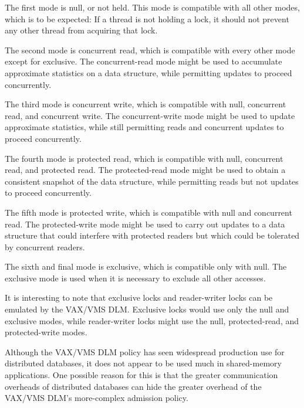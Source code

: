 The first mode is null, or not held.
This mode is compatible with all other modes, which is to be expected:
If a thread is not holding a lock, it should not prevent any
other thread from acquiring that lock.

The second mode is concurrent read, which is compatible with every other
mode except for exclusive.
The concurrent-read mode might be used to accumulate approximate
statistics on a data structure, while permitting updates to proceed
concurrently.

The third mode is concurrent write, which is compatible with null,
concurrent read, and concurrent write.
The concurrent-write mode might be used to update approximate statistics,
while still permitting reads and concurrent updates to proceed
concurrently.

The fourth mode is protected read, which is compatible with null,
concurrent read, and protected read.
The protected-read mode might be used to obtain a consistent snapshot
of the data structure, while permitting reads but not updates to
proceed concurrently.

The fifth mode is protected write, which is compatible with null and
concurrent read.
The protected-write mode might be used to carry out updates to a data
structure that could interfere with protected readers but which could
be tolerated by concurrent readers.

The sixth and final mode is exclusive, which is compatible only with null.
The exclusive mode is used when it is necessary to exclude all other accesses.

It is interesting to note that exclusive locks and reader-writer locks
can be emulated by the VAX/VMS DLM.
Exclusive locks would use only the null and exclusive modes, while
reader-writer locks might use the null, protected-read, and
protected-write modes.

\QuickQuizEnd

Although the VAX/VMS DLM policy has seen widespread production use
for distributed databases, it does not appear to be used much in
shared-memory applications.
One possible reason for this is that the greater communication overheads
of distributed databases can hide the greater overhead of the
VAX/VMS DLM's more-complex admission policy.

